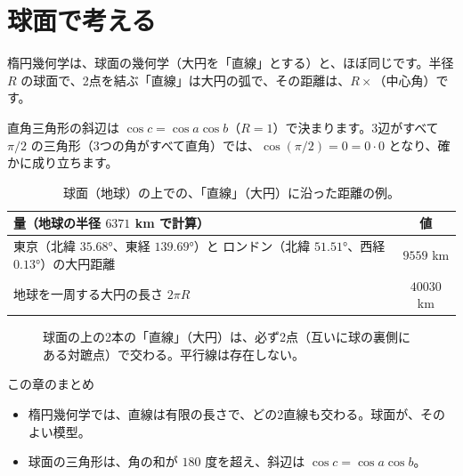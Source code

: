 \documentclass[a4paper,11pt,openany]{ltjsbook}
\begin{document}
\section{球面で考える}

楕円幾何学は、球面の幾何学（大円を「直線」とする）と、ほぼ同じです。半径 $R$ の球面で、2点を結ぶ「直線」は大円の弧で、その距離は、$R\times$（中心角）です。

直角三角形の斜辺は $\cos c=\cos a\cos b$（$R=1$）で決まります。3辺がすべて $\pi/2$ の三角形（3つの角がすべて直角）では、$\cos(\pi/2)=0=0\cdot0$ となり、確かに成り立ちます。

\begin{table}[htbp]
\centering
\begin{tabular}{lc}
\toprule
量（地球の半径 $6371$ km で計算） & 値\\
\midrule
東京（北緯 $35.68$°、東経 $139.69$°）と ロンドン（北緯 $51.51$°、西経 $0.13$°）の大円距離 & $9559$ km\\
地球を一周する大円の長さ $2\pi R$ & $40030$ km\\
\bottomrule
\end{tabular}
\caption{球面（地球）の上での、「直線」（大円）に沿った距離の例。}
\end{table}

\begin{figure}[htbp]
\centering
{}
\caption{球面の上の2本の「直線」（大円）は、必ず2点（互いに球の裏側にある対蹠点）で交わる。平行線は存在しない。}
\end{figure}

\begin{pointbox}{この章のまとめ}
\begin{itemize}[leftmargin=*]
\item 楕円幾何学では、直線は有限の長さで、どの2直線も交わる。球面が、そのよい模型。
\item 球面の三角形は、角の和が $180$ 度を超え、斜辺は $\cos c=\cos a\cos b$。
\end{itemize}
\end{pointbox}
\end{document}
